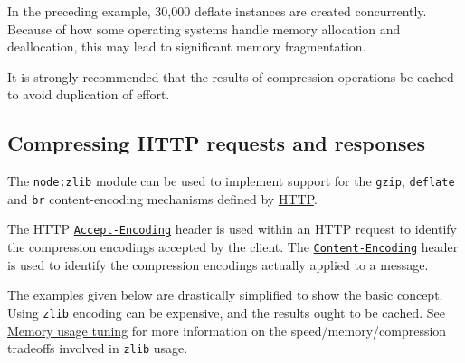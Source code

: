 In the preceding example, 30,000 deflate instances are created
concurrently. Because of how some operating systems handle memory
allocation and deallocation, this may lead to significant memory
fragmentation.

It is strongly recommended that the results of compression operations be
cached to avoid duplication of effort.

\subsection{Compressing HTTP requests and
responses}\label{compressing-http-requests-and-responses}

The \texttt{node:zlib} module can be used to implement support for the
\texttt{gzip}, \texttt{deflate} and \texttt{br} content-encoding
mechanisms defined by
\href{https://tools.ietf.org/html/rfc7230\#section-4.2}{HTTP}.

The HTTP
\href{https://www.w3.org/Protocols/rfc2616/rfc2616-sec14.html\#sec14.3}{\texttt{Accept-Encoding}}
header is used within an HTTP request to identify the compression
encodings accepted by the client. The
\href{https://www.w3.org/Protocols/rfc2616/rfc2616-sec14.html\#sec14.11}{\texttt{Content-Encoding}}
header is used to identify the compression encodings actually applied to
a message.

The examples given below are drastically simplified to show the basic
concept. Using \texttt{zlib} encoding can be expensive, and the results
ought to be cached. See \hyperref[memory-usage-tuning]{Memory usage
tuning} for more information on the speed/memory/compression tradeoffs
involved in \texttt{zlib} usage.


